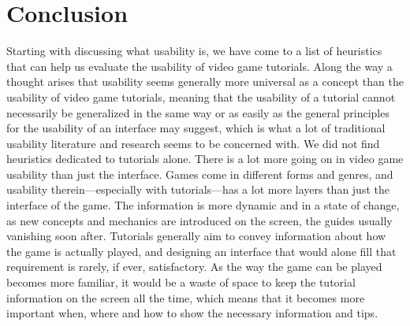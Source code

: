 \chapter{Conclusion}
Starting with discussing what usability is, we have come to a list of heuristics that can help us evaluate the usability of video game tutorials. Along the way a thought arises that usability seems generally more universal as a concept than the usability of video game tutorials, meaning that the usability of a tutorial cannot necessarily be generalized in the same way or as easily as the general principles for the usability of an interface may suggest, which is what a lot of traditional usability literature and research seems to be concerned with. We did not find heuristics dedicated to tutorials alone. There is a lot more going on in video game usability than just the interface. Games come in different forms and genres, and usability therein---especially with tutorials---has a lot more layers than just the interface of the game. The information is more dynamic and in a state of change, as new concepts and mechanics are introduced on the screen, the guides usually vanishing soon after. Tutorials generally aim to convey information about how the game is actually played, and designing an interface that would alone fill that requirement is rarely, if ever, satisfactory. As the way the game can be played becomes more familiar, it would be a waste of space to keep the tutorial information on the screen all the time, which means that it becomes more important when, where and how to show the necessary information and tips. 

